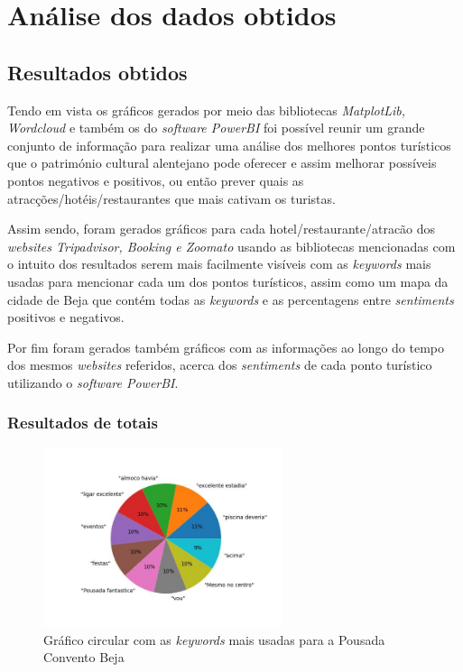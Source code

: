 \chapter{Análise dos dados obtidos}
\label{cap9}

\section{Resultados obtidos}

Tendo em vista os gráficos gerados por meio das bibliotecas \textit{MatplotLib, Wordcloud} \cite{gfg3} \cite{va1} e também os do \textit{software PowerBI}  foi possível reunir um grande conjunto de informação para realizar uma análise dos melhores pontos turísticos que o património cultural alentejano pode oferecer e assim melhorar possíveis pontos negativos e positivos, ou então prever quais as atracções/hotéis/restaurantes que mais cativam os turistas.

Assim sendo, foram gerados gráficos para cada hotel/restaurante/atracão dos \textit{websites Tripadvisor, Booking e Zoomato} usando as bibliotecas mencionadas com o intuito dos resultados serem mais facilmente visíveis com as \textit{keywords} mais usadas para mencionar cada um dos pontos turísticos, assim como um mapa da cidade de Beja que contém todas as \textit{keywords} e as percentagens entre \textit{sentiments} positivos e negativos.

Por fim foram gerados também gráficos com as informações ao longo do tempo dos mesmos \textit{websites} referidos, acerca dos \textit{sentiments} de cada ponto turístico utilizando o \textit{software PowerBI}.

\newpage
\subsection{Resultados de totais}

\begin{figure}[!htb]
\centering
\includegraphics[width=7cm]{figuras/TripAdvisor/Hotels/hotel0_keywords.jpeg}
\caption{Gráfico circular com as \textit{keywords} mais usadas para a Pousada Convento Beja}
\label{fig:exemplofig}
\end{figure}

